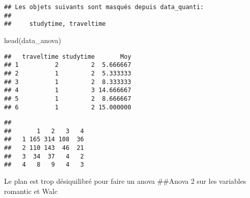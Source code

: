 \documentclass[
]{article}
\newenvironment{Shaded}{\begin{snugshade}}{\end{snugshade}}
\newcommand{\CommentTok}[1]{\textcolor[rgb]{0.56,0.35,0.01}{\textit{#1}}}
\newcommand{\DecValTok}[1]{\textcolor[rgb]{0.00,0.00,0.81}{#1}}
\newcommand{\FunctionTok}[1]{\textcolor[rgb]{0.00,0.00,0.00}{#1}}
\newcommand{\NormalTok}[1]{#1}
\newcommand{\OtherTok}[1]{\textcolor[rgb]{0.56,0.35,0.01}{#1}}
\newcommand{\SpecialCharTok}[1]{\textcolor[rgb]{0.00,0.00,0.00}{#1}}
\begin{document}
\begin{Shaded}
\end{Shaded}

\begin{verbatim}
## Les objets suivants sont masqués depuis data_quanti:
## 
##     studytime, traveltime
\end{verbatim}

\begin{Shaded}
\begin{Highlighting}[]
\FunctionTok{head}\NormalTok{(data\_anova)}
\end{Highlighting}
\end{Shaded}

\begin{verbatim}
##   traveltime studytime       Moy
## 1          2         2  5.666667
## 2          1         2  5.333333
## 3          1         2  8.333333
## 4          1         3 14.666667
## 5          1         2  8.666667
## 6          1         2 15.000000
\end{verbatim}

\begin{Shaded}
\end{Shaded}

\begin{verbatim}
##    
##       1   2   3   4
##   1 165 314 108  36
##   2 110 143  46  21
##   3  34  37   4   2
##   4   8   9   4   3
\end{verbatim}

Le plan est trop désiquilibré pour faire un anova \#\#Anova 2 sur les
variables romantic et Walc
\end{document}
